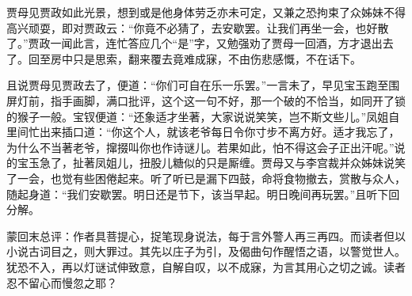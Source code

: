 \begin{parag}


    贾母见贾政如此光景，想到或是他身体劳乏亦未可定，又兼之恐拘束了众姊妹不得高兴顽耍，即对贾政云：“你竟不必猜了，去安歇罢。让我们再坐一会，也好散了。”贾政一闻此言，连忙答应几个“是”字，又勉强劝了贾母一回酒，方才退出去了。回至房中只是思索，翻来覆去竟难成寐，不由伤悲感慨，不在话下。
\end{parag}


\begin{parag}


    且说贾母见贾政去了，便道：“你们可自在乐一乐罢。”一言未了，早见宝玉跑至围屏灯前，指手画脚，满口批评，这个这一句不好，那一个破的不恰当，如同开了锁的猴子一般。宝钗便道：“还象适才坐著，大家说说笑笑，岂不斯文些儿。”凤姐自里间忙出来插口道：“你这个人，就该老爷每日令你寸步不离方好。适才我忘了，为什么不当著老爷，撺掇叫你也作诗谜儿。若果如此，怕不得这会子正出汗呢。”说的宝玉急了，扯著凤姐儿，扭股儿糖似的只是厮缠。贾母又与李宫裁并众姊妹说笑了一会，也觉有些困倦起来。听了听已是漏下四鼓，命将食物撤去，赏散与众人，随起身道：“我们安歇罢。明日还是节下，该当早起。明日晚间再玩罢。”且听下回分解。
\end{parag}

\begin{parag}

    \begin{note}蒙回末总评：作者具菩提心，捉笔现身说法，每于言外警人再三再四。而读者但以小说古词目之，则大罪过。其先以庄子为引，及偈曲句作醒悟之语，以警觉世人。犹恐不入，再以灯谜试伸致意，自解自叹，以不成寐，为言其用心之切之诚。读者忍不留心而慢忽之耶？\end{note}
\end{parag}

